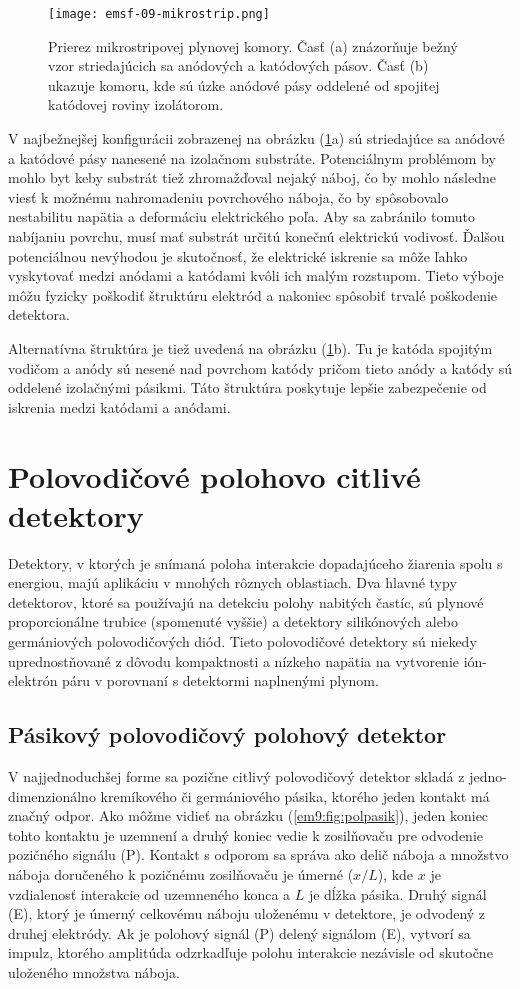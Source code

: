 \documentclass[../../main.tex]{subfiles}
\begin{document}
\begin{figure}[!h]
\texttt{[image: emsf-09-mikrostrip.png]}
\centering
\caption{Prierez mikrostripovej plynovej komory. Časť (a) znázorňuje bežný vzor striedajúcich sa anódových a katódových pásov. Časť (b) ukazuje komoru, kde sú úzke anódové pásy oddelené od spojitej katódovej roviny izolátorom.}
\label{em9:fig:mikrostrip}
\end{figure}

V najbežnejšej konfigurácii zobrazenej na obrázku (\ref{em9:fig:mikrostrip}a) sú striedajúce sa anódové a katódové pásy nanesené na izolačnom substráte. Potenciálnym problémom by mohlo byt keby substrát tiež zhromažďoval nejaký náboj, čo by mohlo následne viesť k možnému nahromadeniu povrchového náboja, čo by spôsobovalo nestabilitu napätia a deformáciu elektrického poľa. Aby sa zabránilo tomuto nabíjaniu povrchu, musí mať substrát určitú konečnú elektrickú vodivosť. Ďalšou potenciálnou nevýhodou je skutočnosť, že elektrické iskrenie sa môže ľahko vyskytovať medzi anódami a katódami kvôli ich malým rozstupom. Tieto výboje môžu fyzicky poškodiť štruktúru elektród a nakoniec spôsobiť trvalé poškodenie detektora.

Alternatívna štruktúra je tiež uvedená na obrázku (\ref{em9:fig:mikrostrip}b). Tu je katóda spojitým vodičom a anódy sú nesené nad povrchom katódy pričom tieto anódy a katódy sú oddelené izolačnými pásikmi. Táto štruktúra poskytuje lepšie zabezpečenie od iskrenia medzi katódami a anódami.

\section{Polovodičové polohovo citlivé detektory}
Detektory, v ktorých je snímaná poloha interakcie dopadajúceho žiarenia spolu s energiou, majú aplikáciu v mnohých rôznych oblastiach. Dva hlavné typy detektorov, ktoré sa používajú na detekciu polohy nabitých častíc, sú plynové proporcionálne trubice (spomenuté vyššie) a detektory silikónových alebo germániových polovodičových diód. Tieto polovodičové detektory sú niekedy uprednostňované z dôvodu kompaktnosti a nízkeho napätia na vytvorenie ión-elektrón páru v porovnaní s detektormi naplnenými plynom. 

\subsection{Pásikový polovodičový polohový detektor} 
V najjednoduchšej forme sa pozične citlivý polovodičový detektor skladá z jedno-dimenzionálno kremíkového či germániového pásika, ktorého jeden kontakt má značný odpor. Ako môžme vidieť na obrázku (\ref{em9:fig:polpasik}), jeden koniec tohto kontaktu je uzemnení a druhý koniec vedie k zosilňovaču pre odvodenie pozičného signálu (P). Kontakt s odporom sa správa ako delič náboja a množstvo náboja doručeného k pozičnému zosilňovaču je úmerné ($x/L$), kde $x$ je vzdialenosť interakcie od uzemneného konca a $L$ je dĺžka pásika. Druhý signál (E), ktorý je úmerný celkovému náboju uloženému v detektore, je odvodený z druhej elektródy. Ak je polohový signál (P) delený signálom (E), vytvorí sa impulz, ktorého amplitúda odzrkadľuje polohu interakcie nezávisle od skutočne uloženého množstva náboja. 
\end{document}
